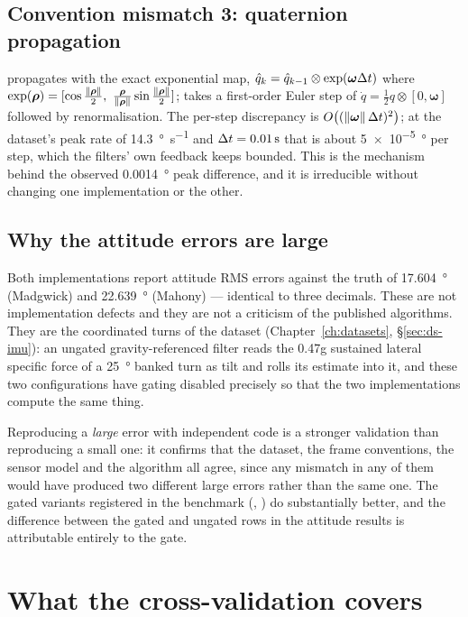 \subsection{Convention mismatch 3: quaternion propagation}

 propagates with the exact exponential map,
$\hat q_k = \hat q_{k-1}\otimes\exp(\bm\omega\Delta t)$ where $\exp(\bm\rho) = [\cos\frac{\left\lVert \bm\rho \right\rVert}{2},\
\frac{\bm\rho}{\left\lVert \bm\rho \right\rVert}\sin\frac{\left\lVert \bm\rho \right\rVert}{2}]$;  takes a first-order Euler
step of $\dot q = \frac12 q\otimes[0,\bm\omega]$ followed by renormalisation. The per-step
discrepancy is $O\bigl((\left\lVert \bm\omega \right\rVert\Delta t)^2\bigr)$; at the dataset's peak rate of
\SI{14.3}{\degree\per\second} and $\Delta t = \SI{0.01}{\second}$ that is about
\SI{5e-5}{\degree} per step, which the filters' own feedback keeps bounded. This is the mechanism
behind the observed \SI{0.0014}{\degree} peak difference, and it is irreducible without changing one
implementation or the other.

\subsection{Why the attitude errors are large}

Both implementations report attitude RMS errors against the truth of \SI{17.604}{\degree}
(Madgwick) and \SI{22.639}{\degree} (Mahony) --- identical to three decimals. These are not
implementation defects and they are not a criticism of the published algorithms. They are the
coordinated turns of the dataset (Chapter~\ref{ch:datasets}, \S\ref{sec:ds-imu}): an ungated
gravity-referenced filter reads the \SI{0.47}{}g sustained lateral specific force of a
\SI{25}{\degree} banked turn as tilt and rolls its estimate into it, and these two configurations
have gating disabled precisely so that the two implementations compute the same thing.

Reproducing a \emph{large} error with independent code is a stronger validation than reproducing a
small one: it confirms that the dataset, the frame conventions, the sensor model and the algorithm
all agree, since any mismatch in any of them would have produced two different large errors rather
than the same one. The gated variants registered in the benchmark
(\code{Madgwick-Gated}, \code{Mahony-Gated}) do substantially better, and the difference between the
gated and ungated rows in the attitude results is attributable entirely to the gate.

\section{What the cross-validation covers}

